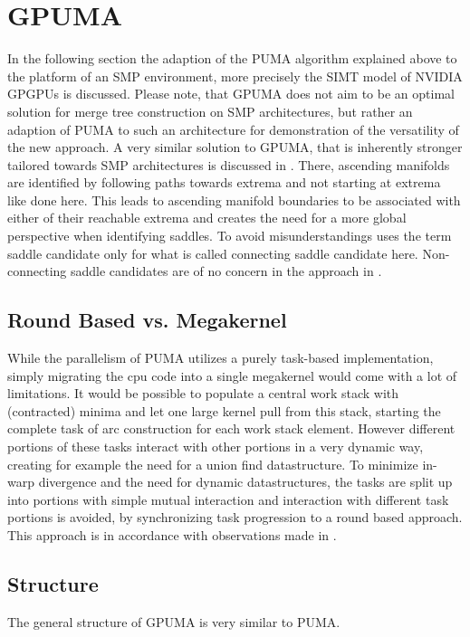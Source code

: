 \documentclass{scrartcl}
\begin{document}
\section{GPUMA}
In the following section the adaption of the PUMA algorithm explained above to the platform of an SMP environment, more precisely the SIMT model of NVIDIA GPGPUs is discussed. Please note, that GPUMA does not aim to be an optimal solution for merge tree construction on SMP architectures, but rather an adaption of PUMA to such an architecture for demonstration of the versatility of the new approach. A very similar solution to GPUMA, that is inherently stronger tailored towards SMP architectures is discussed in \cite{Carr}. There, ascending manifolds are identified by following paths towards extrema and not starting at extrema like done here. This leads to ascending manifold boundaries to be associated with either of their reachable extrema and creates the need for a more global perspective when identifying saddles. To avoid misunderstandings \cite{Carr} uses the term saddle candidate only for what is called connecting saddle candidate here. Non-connecting saddle candidates are of no concern in the approach in \cite{Carr}.

\subsection{Round Based vs. Megakernel}
While the parallelism of PUMA utilizes a purely task-based implementation, simply migrating the cpu code into a single megakernel would come with a lot of limitations. It would be possible to populate a central work stack with (contracted) minima and let one large kernel pull from this stack, starting the complete task of arc construction for each work stack element. However different portions of these tasks interact with other portions in a very dynamic way, creating for example the need for a union find datastructure. To minimize in-warp divergence and the need for dynamic datastructures, the tasks are split up into portions with simple mutual interaction and interaction with different task portions is avoided, by synchronizing task progression to a round based approach. This approach is in accordance with observations made in \cite{megakernel}.

\subsection{Structure}
The general structure of GPUMA is very similar to PUMA. 
\end{document}
